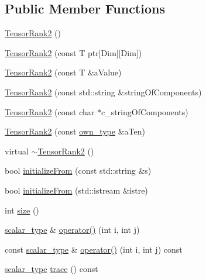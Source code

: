 \subsection*{Public Member Functions}
\begin{DoxyCompactItemize}
\item 
\hyperlink{classcofe_1_1TensorRank2_a224848030ac161c4962376c189450a42}{Tensor\-Rank2} ()
\item 
\hyperlink{classcofe_1_1TensorRank2_ac7cdeb09ca5cf60fb0ecf9c2ad72ff0e}{Tensor\-Rank2} (const T ptr\mbox{[}Dim\mbox{]}\mbox{[}Dim\mbox{]})
\item 
\hyperlink{classcofe_1_1TensorRank2_adb070405bdf51413255ebd736516cfb8}{Tensor\-Rank2} (const T \&a\-Value)
\item 
\hyperlink{classcofe_1_1TensorRank2_a63a8348ee7fea2cec9345d0474e1b577}{Tensor\-Rank2} (const std\-::string \&string\-Of\-Components)
\item 
\hyperlink{classcofe_1_1TensorRank2_a405b0de39bca1744a285fb08cf189228}{Tensor\-Rank2} (const char $\ast$c\-\_\-string\-Of\-Components)
\item 
\hyperlink{classcofe_1_1TensorRank2_a5c10f45abc4b4c34016e0af1d54a565d}{Tensor\-Rank2} (const \hyperlink{classcofe_1_1TensorRank2_afef4f2c69f8a804d795c334bc382dc5f}{own\-\_\-type} \&a\-Ten)
\item 
virtual \hyperlink{classcofe_1_1TensorRank2_aea3bdfe6a4751a76c034e4fc350ddae4}{$\sim$\-Tensor\-Rank2} ()
\item 
bool \hyperlink{classcofe_1_1TensorRank2_a191fa7ce4804287b6496066a5df2a799}{initialize\-From} (const std\-::string \&s)
\item 
bool \hyperlink{classcofe_1_1TensorRank2_a91c568920d4b5f5f9f6f8bdafab7bc95}{initialize\-From} (std\-::istream \&istre)
\item 
int \hyperlink{classcofe_1_1TensorRank2_a56346adecab6c8e74def3fb980eea29e}{size} ()
\item 
\hyperlink{classcofe_1_1TensorRank2_a3dce726b0c34912c6549a5911f478eaf}{scalar\-\_\-type} \& \hyperlink{classcofe_1_1TensorRank2_a70ce7c8bfbe7e4bfd396d10bcfa1f99b}{operator()} (int i, int j)
\item 
const \hyperlink{classcofe_1_1TensorRank2_a3dce726b0c34912c6549a5911f478eaf}{scalar\-\_\-type} \& \hyperlink{classcofe_1_1TensorRank2_a4d33fccaf8405418f327fbeaa578eac1}{operator()} (int i, int j) const 
\item 
\hyperlink{classcofe_1_1TensorRank2_a3dce726b0c34912c6549a5911f478eaf}{scalar\-\_\-type} \hyperlink{classcofe_1_1TensorRank2_a3f6357e9fb217490cd9d959887163328}{trace} () const 

\end{DoxyCompactItemize}
